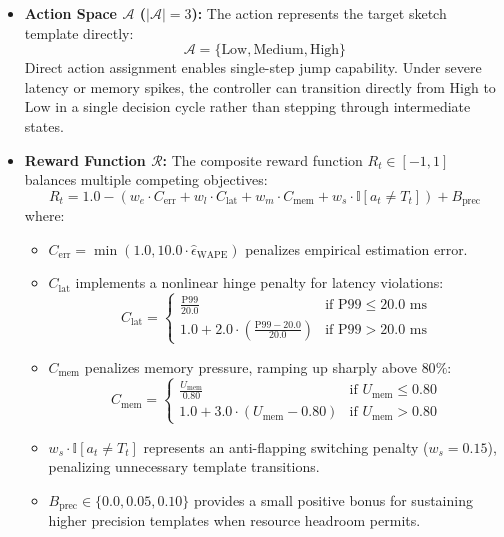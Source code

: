 \begin{itemize}
 \item \textbf{Action Space $\mathcal{A}$ ($|\mathcal{A}| = 3$):} The action represents the target sketch template directly:
 \begin{equation}
        \mathcal{A} = \{\text{Low}, \text{Medium}, \text{High}\}
    \end{equation}
 Direct action assignment enables single-step jump capability. Under severe latency or memory spikes, the controller can transition directly from $\text{High}$ to $\text{Low}$ in a single decision cycle rather than stepping through intermediate states.

 \item \textbf{Reward Function $\mathcal{R}$:} The composite reward function $R_t \in [-1, 1]$ balances multiple competing objectives:
 \begin{equation}
        R_t = 1.0 - \left(w_e \cdot C_{\text{err}} + w_l \cdot C_{\text{lat}} + w_m \cdot C_{\text{mem}} + w_s \cdot \mathbb{I}[a_t \ne T_t]\right) + B_{\text{prec}}
        \label{eq:rl_reward}
    \end{equation}
 where:
 \begin{itemize}
 \item $C_{\text{err}} = \min(1.0, 10.0 \cdot \hat{\epsilon}_{\text{WAPE}})$ penalizes empirical estimation error.
 \item $C_{\text{lat}}$ implements a nonlinear hinge penalty for latency violations:
 \begin{equation}
            C_{\text{lat}} = \begin{cases}
                \frac{\text{P99}}{20.0} & \text{if } \text{P99} \le 20.0\text{ ms} \\
                1.0 + 2.0 \cdot \left(\frac{\text{P99} - 20.0}{20.0}\right) & \text{if } \text{P99} > 20.0\text{ ms}
            \end{cases}
        \end{equation}
 \item $C_{\text{mem}}$ penalizes memory pressure, ramping up sharply above $80\%$:
 \begin{equation}
            C_{\text{mem}} = \begin{cases}
                \frac{U_{\text{mem}}}{0.80} & \text{if } U_{\text{mem}} \le 0.80 \\
                1.0 + 3.0 \cdot (U_{\text{mem}} - 0.80) & \text{if } U_{\text{mem}} > 0.80
            \end{cases}
        \end{equation}
 \item $w_s \cdot \mathbb{I}[a_t \ne T_t]$ represents an anti-flapping switching penalty ($w_s = 0.15$), penalizing unnecessary template transitions.
 \item $B_{\text{prec}} \in \{0.0, 0.05, 0.10\}$ provides a small positive bonus for sustaining higher precision templates when resource headroom permits.
 \end{itemize}
\end{itemize}

